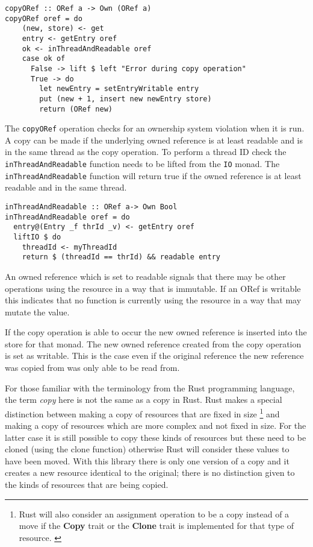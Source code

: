 \documentclass[onehalf,11pt]{beavtex}
\begin{document}
\begin{verbatim}
copyORef :: ORef a -> Own (ORef a)
copyORef oref = do
    (new, store) <- get
    entry <- getEntry oref
    ok <- inThreadAndReadable oref
    case ok of
      False -> lift $ left "Error during copy operation"
      True -> do
        let newEntry = setEntryWritable entry
        put (new + 1, insert new newEntry store)
        return (ORef new)
\end{verbatim}

The \texttt{copyORef} operation checks for an ownership system violation when
it is run.
A copy can be made if the underlying owned reference is at least readable and
is in the same thread as the copy operation.
To perform a thread ID check the \texttt{inThreadAndReadable} function
needs to be lifted from the \texttt{IO} monad.
The \texttt{inThreadAndReadable} function will return true if the owned reference
is at least readable and in the same thread.

\begin{verbatim}
inThreadAndReadable :: ORef a-> Own Bool
inThreadAndReadable oref = do
  entry@(Entry _f thrId _v) <- getEntry oref
  liftIO $ do
    threadId <- myThreadId
    return $ (threadId == thrId) && readable entry
\end{verbatim}

An owned reference which is set to readable signals that there may be other
operations using the resource in a way that is immutable.
If an ORef is writable this indicates that no function is currently using the
resource in a way that may mutate the value.

If the copy operation is able to occur the new owned reference is inserted into
the store for that monad.  The new owned reference created from the copy
operation is set as writable. This is the case even if the original reference
the new reference was copied from was only able to be read from.

For those familiar with the terminology from the Rust programming language, the
term \textit{copy} here is not the same as a copy in Rust. Rust makes a special
distinction between making a copy of resources that are fixed in size
\footnote{Rust will also consider an assignment operation to be a copy instead
  of a move if the \textbf{Copy} trait or the \textbf{Clone} trait is
  implemented for that type of resource. \cite{rust_book_traits}
  \cite{rust_docs_clone_trait}}
and making a copy of resources which are more complex and not fixed in size.
For the latter case it is still possible to copy these kinds of resources but these
need to be cloned (using the clone function) otherwise Rust will consider these
values to have been moved. \cite{rust_book_ownership}
With this library there is only one version of a copy and it creates a new
resource identical to the original; there is no distinction given to the kinds
of resources that are being copied.
\end{document}
